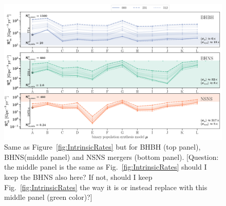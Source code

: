 \documentclass[twocolumn]{aastex63}
\newcommand{\question}[1]{\textcolor{OliveGreen}{[Question: #1]}}
\newcommand\rate{\mathcal{R}}
\newcommand\bhnsSingle{BHNS\xspace}
\newcommand{\ts}{\ensuremath{{t}_{\rm{s}}}\xspace}
\newcommand{\tmerger}{\ensuremath{{t}_{\rm{m}}}\xspace}
\newcommand{\Ndet}{\ensuremath{{N}_{\rm{det}}}\xspace}
\newcommand{\Vc}{\ensuremath{{V}_{\rm{c}}}\xspace}
\newcommand*\diff{\mathop{}\!\mathrm{d}}
\newcommand{\mAzero}{\ensuremath{\rm{A}000}\xspace}
\begin{document}
\begin{figure}
    \centering
\includegraphics[width=1.0\textwidth]{../PlottingScripts/8_PredictedRates_BPS_and_MSSFR_variations/Rates_intrinsic_AllDCO.png}
\caption{Same as Figure~\ref{fig:IntrinsicRates} but for \ac{BHBH} (top panel), \bhnsSingle (middle panel) and \ac{NSNS} mergers (bottom panel). \question{the middle panel is the same as Fig.~\ref{fig:IntrinsicRates} should I keep the BHNS also here? If not, should I keep Fig.~\ref{fig:IntrinsicRates} the way it is or instead replace with this middle panel (green color)?} } 
\label{fig:IntrinsicRatesBBHBNSBHNS}
\end{figure}
%
\end{document}
